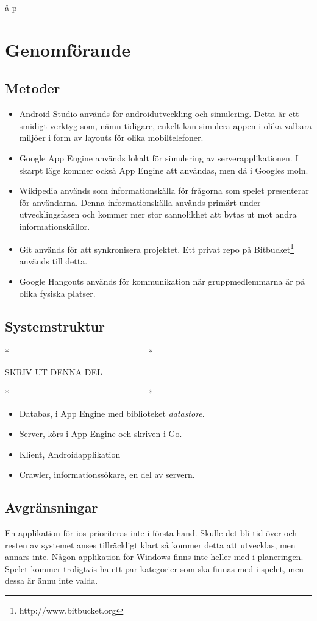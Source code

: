 å p\documentclass[swedish,12pt,a4paper]{article}
\begin{document}
\section{Genomförande}

\subsection{Metoder}
\begin{itemize}
\item Android Studio används för androidutveckling och simulering. Detta är ett smidigt verktyg som, nämn tidigare, enkelt kan simulera appen i olika valbara miljöer i form av layouts för olika mobiltelefoner. 
\item Google App Engine används lokalt för simulering av serverapplikationen. I skarpt läge kommer också App Engine att användas, men då i Googles moln.
\item Wikipedia används som informationskälla för frågorna som spelet presenterar för användarna. Denna informationskälla används primärt under utvecklingsfasen och kommer mer stor sannolikhet att bytas ut mot andra informationskällor.
\item Git används för att synkronisera projektet. Ett privat repo på Bitbucket\footnote{http://www.bitbucket.org} används till detta.
\item Google Hangouts används för kommunikation när gruppmedlemmarna är på olika fysiska platser.
\end{itemize}

\subsection{Systemstruktur}

*-------------------------------------------------*


                 SKRIV UT DENNA DEL


*-------------------------------------------------*
\begin{itemize}
\item Databas, i App Engine med biblioteket \textit{datastore}.
\item Server, körs i App Engine och skriven i Go.
\item Klient, Androidapplikation
\item Crawler, informationssökare, en del av servern.
\end{itemize}

\subsection{Avgränsningar}
En applikation för ios prioriteras inte i första hand. Skulle det bli tid över och resten av systemet anses tillräckligt klart så kommer detta att utvecklas, men annars inte. Någon applikation för Windows finns inte heller med i planeringen. Spelet kommer troligtvis ha ett par kategorier som ska finnas med i spelet, men dessa är ännu inte valda.
\end{document}
